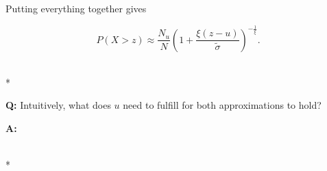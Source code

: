 Putting everything together gives


\begin{equation}
    P(X>z) \approx \frac{N_u}{N}  \left( 1 + \frac{\xi (z-u)}{\tilde{\sigma}} \right)^{-\frac{1}{\xi}}.
\end{equation}


\hrulefill\\*

\textbf{Q:} Intuitively, what does $u$ need to fulfill for both approximations to
hold?

\textbf{A:} 

\hrulefill\\*
